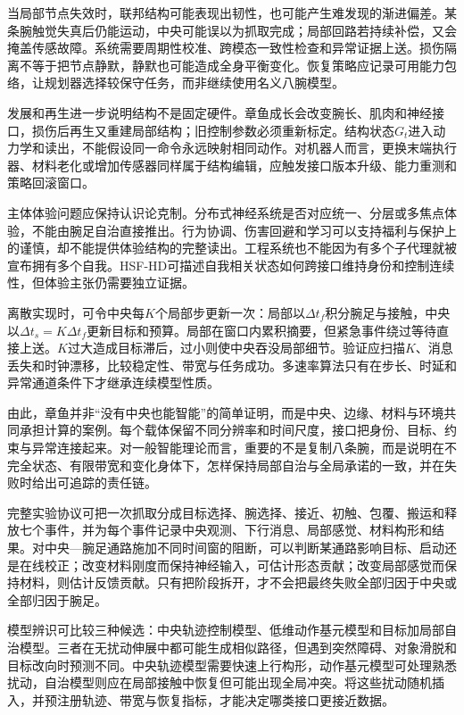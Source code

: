 当局部节点失效时，联邦结构可能表现出韧性，也可能产生难发现的渐进偏差。某条腕触觉失真后仍能运动，中央可能误以为抓取完成；局部回路若持续补偿，又会掩盖传感故障。系统需要周期性校准、跨模态一致性检查和异常证据上送。损伤隔离不等于把节点静默，静默也可能造成全身平衡变化。恢复策略应记录可用能力包络，让规划器选择较保守任务，而非继续使用名义八腕模型。

发展和再生进一步说明结构不是固定硬件。章鱼成长会改变腕长、肌肉和神经接口，损伤后再生又重建局部结构；旧控制参数必须重新标定。结构状态$G_t$进入动力学和读出，不能假设同一命令永远映射相同动作。对机器人而言，更换末端执行器、材料老化或增加传感器同样属于结构编辑，应触发接口版本升级、能力重测和策略回滚窗口。

主体体验问题应保持认识论克制。分布式神经系统是否对应统一、分层或多焦点体验，不能由腕足自治直接推出。行为协调、伤害回避和学习可以支持福利与保护上的谨慎，却不能提供体验结构的完整读出。工程系统也不能因为有多个子代理就被宣布拥有多个自我。HSF-HD可描述自我相关状态如何跨接口维持身份和控制连续性，但体验主张仍需要独立证据。

离散实现时，可令中央每$K$个局部步更新一次：局部以$\Delta t_f$积分腕足与接触，中央以$\Delta t_s=K\Delta t_f$更新目标和预算。局部在窗口内累积摘要，但紧急事件绕过等待直接上送。$K$过大造成目标滞后，过小则使中央吞没局部细节。验证应扫描$K$、消息丢失和时钟漂移，比较稳定性、带宽与任务成功。多速率算法只有在步长、时延和异常通道条件下才继承连续模型性质。

由此，章鱼并非“没有中央也能智能”的简单证明，而是中央、边缘、材料与环境共同承担计算的案例。每个载体保留不同分辨率和时间尺度，接口把身份、目标、约束与异常连接起来。对一般智能理论而言，重要的不是复制八条腕，而是说明在不完全状态、有限带宽和变化身体下，怎样保持局部自治与全局承诺的一致，并在失败时给出可追踪的责任链。

完整实验协议可把一次抓取分成目标选择、腕选择、接近、初触、包覆、搬运和释放七个事件，并为每个事件记录中央观测、下行消息、局部感觉、材料构形和结果。对中央—腕足通路施加不同时间窗的阻断，可以判断某通路影响目标、启动还是在线校正；改变材料刚度而保持神经输入，可估计形态贡献；改变局部感觉而保持材料，则估计反馈贡献。只有把阶段拆开，才不会把最终失败全部归因于中央或全部归因于腕足。

模型辨识可比较三种候选：中央轨迹控制模型、低维动作基元模型和目标加局部自治模型。三者在无扰动伸展中都可能生成相似路径，但遇到突然障碍、对象滑脱和目标改向时预测不同。中央轨迹模型需要快速上行构形，动作基元模型可处理熟悉扰动，自治模型则应在局部接触中恢复但可能出现全局冲突。将这些扰动随机插入，并预注册轨迹、带宽与恢复指标，才能决定哪类接口更接近数据。

